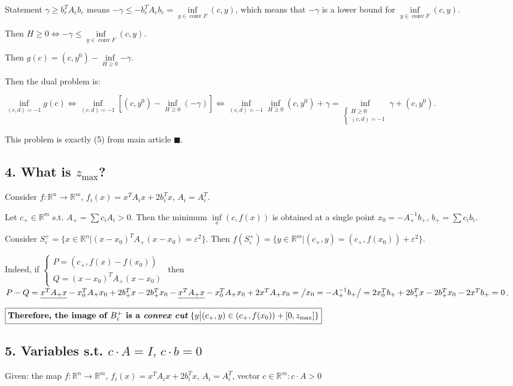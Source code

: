 \documentclass[a4paper]{article}
\DeclareMathOperator{\conv}{conv}
\begin{document}
Statement $\gamma\geqslant b_c^TA_cb_c$ means $-\gamma\leqslant -b_c^TA_cb_c=\inf\limits_{y\in\conv F}(c,y)$, which means that $-\gamma$ is a lower bound for $\inf\limits_{y\in\conv F}(c,y)$.

Then $H\geqslant 0\Leftrightarrow -\gamma\leqslant \inf\limits_{y\in\conv F}(c,y)$.

Then $g(c)=(c,y^0)-\inf\limits_{H\geqslant 0}{-\gamma}$.

Then the dual problem is:

$\inf\limits_{(c,d)=-1}g(c)\Leftrightarrow \inf\limits_{(c,d)=-1}\left[(c,y^0)-\inf\limits_{H\geqslant 0}(-\gamma)\right]\Leftrightarrow \inf\limits_{(c,d)=-1}\inf\limits_{H\geqslant 0}(c,y^0)+\gamma=\boxed{\inf\limits_{\begin{cases}
H\geqslant 0\\
(c,d)=-1
\end{cases}}\gamma+(c,y^0)}$.

This problem is exactly (5) from main article $\blacksquare$.

\subsection*{4. What is $z_{\max}$?}
Consider $f\colon\mathbb{R}^n\to\mathbb{R}^m$, $f_i(x)=x^TA_ix+2b_i^Tx$, $A_i=A_i^T$.

Let $c_+\in\mathbb{R}^m$ s.t. $A_+=\sum c_iA_i > 0$. Then the minimum $\inf\limits_x (c,f(x))$ is obtained at a single point $x_0=-A_+^{-1}b_+$, $b_+=\sum c_ib_i$.

Consider $S_\varepsilon^+=\{x\in\mathbb{R}^n\big| (x-x_0)^TA_+(x-x_0)= \varepsilon^2\}$. Then $f(S_\varepsilon^+)=\{y\in\mathbb{R}^m\big| (c_+,y)=(c_+,f(x_0))+\varepsilon^2 \}$.

Indeed, if $\begin{cases}
P=(c_+,f(x)-f(x_0))\\
Q=(x-x_0)^TA_+(x-x_0)
\end{cases}$
then $P-Q=\underline{x^TA_+x}-x_0^TA_+x_0+2b_+^Tx-2b_+^Tx_0-\underline{x^TA_+x}-x_0^TA_+x_0+2x^TA_+x_0=\left/x_0=-A_+^{-1}b_+\right/=2x_0^Tb_++2b_+^Tx-2b_+^Tx_0-2x^Tb_+=0$.

$\boxed{\mbox{{\bf Therefore, the image of $B_\varepsilon^+$ is a {\em convex cut}} $\{y\big| (c_+,y)\in (c_+,f(x_0))+[0,z_{\max}]\}$}}$

\subsection*{5. Variables s.t. $c\cdot A=I,\,c\cdot b=0$}
Given: the map $f\colon\mathbb{R}^n\to\mathbb{R}^m$, $f_i(x)=x^TA_ix+2b_i^Tx$, $A_i=A_i^T$, vector $c\in\mathbb{R}^m\colon c\cdot A>0$
\end{document}
